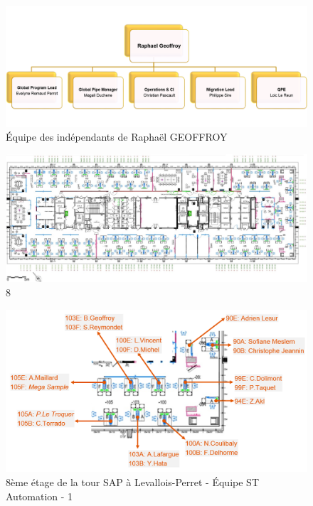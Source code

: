 \begin{figure}[h!]
  \centering
      \includegraphics[width=1.1\textwidth]{images/allRaphaelTeam3.png}
  \caption{\'{E}quipe des ind\'{e}pendants de Rapha\"{e}l GEOFFROY}
	\label{figure:}
\end{figure}


\begin{figure}[h!]
  \centering
      \includegraphics[width=1.2\textwidth]{images/8floor.jpg}
  \caption{8}
	\label{figure:}
\end{figure}

\begin{figure}[!h]
  \centering
      \includegraphics[width=1.2\textwidth]{images/positionnement1.png}
  \caption{8\`{e}me \'{e}tage de la tour SAP \`{a} Levallois-Perret - \'{E}quipe ST Automation - 1}
	\label{figure:}
\end{figure}


